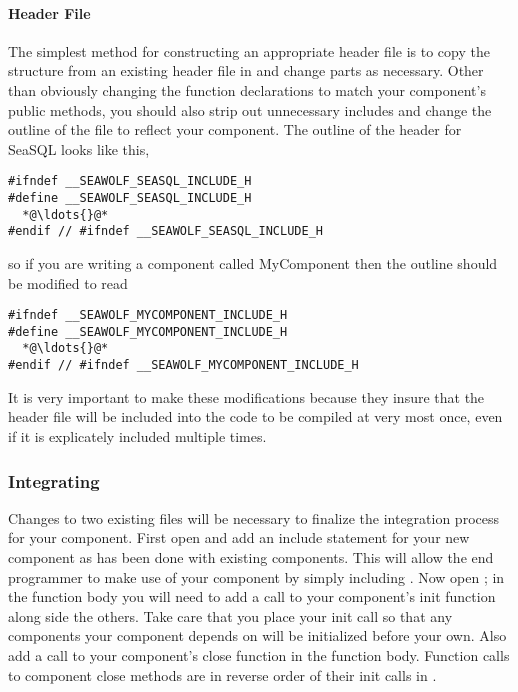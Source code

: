 \paragraph{Header File}
The simplest method for constructing an appropriate header file is to copy the
structure from an existing \libseawolf{} header file in
 and change parts as
necessary. Other than obviously changing the function declarations to match your
component's public methods, you should also strip out unnecessary includes and
change the outline of the file to reflect your component. The outline of the
header for SeaSQL looks like this,
\begin{lstlisting}[language=Cextended, caption=seasql.h outline, escapeinside={{*@}{@*}}]
#ifndef __SEAWOLF_SEASQL_INCLUDE_H
#define __SEAWOLF_SEASQL_INCLUDE_H
  *@\ldots{}@*
#endif // #ifndef __SEAWOLF_SEASQL_INCLUDE_H
\end{lstlisting}
so if you are writing a component called MyComponent then the outline should be modified to read 
\begin{lstlisting}[language=Cextended, caption=mycomponent.h outline, escapeinside={{*@}{@*}}]
#ifndef __SEAWOLF_MYCOMPONENT_INCLUDE_H
#define __SEAWOLF_MYCOMPONENT_INCLUDE_H
  *@\ldots{}@*
#endif // #ifndef __SEAWOLF_MYCOMPONENT_INCLUDE_H
\end{lstlisting}
It is very important to make these modifications because they insure that the
header file will be included into the code to be compiled at very most once,
even if it is explicately included multiple times.

\subsubsection{Integrating}
Changes to two existing files will be necessary to finalize the integration
process for your component. First open  and add an
include statement for your new component as has been done with existing
components. This will allow the end programmer to make use of your component by
simply including . Now open ; in the
 function body you will need to
add a call to your component's init function along side the others. Take care
that you place your init call so that any components your component depends on
will be initialized before your own. Also add a call to your component's close
function in the  function
body. Function calls to component close methods are in reverse order of their
init calls in .

